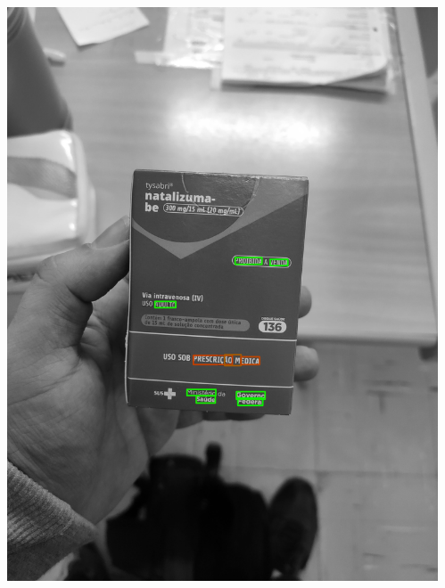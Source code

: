 \begin{frame}
\begin{columns}
\begin{column}{0.24\textwidth}
			\includegraphics[height=0.35\textheight]{../pictures/tysabri_gray_boxes.jpg}
		\end{column}
		\begin{column}{0.24\textwidth}\centering

\end{column}
\end{columns}
\end{frame}
